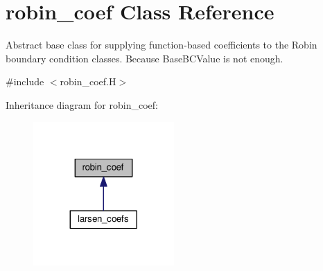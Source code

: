 \hypertarget{classrobin__coef}{}\section{robin\+\_\+coef Class Reference}
\label{classrobin__coef}


Abstract base class for supplying function-\/based coefficients to the Robin boundary condition classes. Because Base\+B\+C\+Value is not enough.  




{\ttfamily \#include $<$robin\+\_\+coef.\+H$>$}



Inheritance diagram for robin\+\_\+coef\+:\nopagebreak
\begin{figure}[H]
\begin{center}
\leavevmode
\includegraphics[width=152pt]{classrobin__coef__inherit__graph}
\end{center}
\end{figure}
